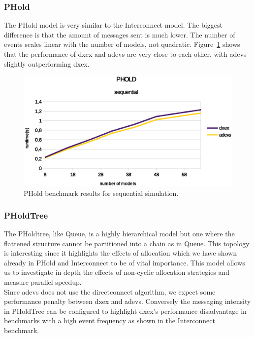 \subsubsection{PHold}\label{4-seq-PHold}
The PHold model is very similar to the Interconnect model. The biggest difference is that the amount of messages sent is much lower. The number of events scales linear with the number of models, not quadratic. Figure~\ref{fig:Phold_benchmark} shows that the performance of dxex and adevs are very close to each-other, with adevs slightly outperforming dxex.
\begin{figure}
	\center
	\includegraphics[width=\plotfraction\columnwidth]{fig/phold_sequential.eps}
	\caption{PHold benchmark results for sequential simulation.}
	\label{fig:Phold_benchmark}
\end{figure}
\subsubsection{PHoldTree}
The PHoldtree, like Queue, is a highly hierarchical model but one where the flattened structure cannot be partitioned into a chain as in Queue.
This topology is interesting since it highlights the effects of allocation which we have shown already in PHold and Interconnect to be of vital importance. This model allows us to investigate in depth the effects of non-cyclic allocation strategies and measure parallel speedup.\\
Since adevs does not use the directconnect algorithm, we expect some performance penalty between dxex and adevs. Conversely the messaging intensity in PHoldTree can be configured to highlight dxex's performance disadvantage in  benchmarks with a high event frequency as shown in the Interconnect benchmark.
